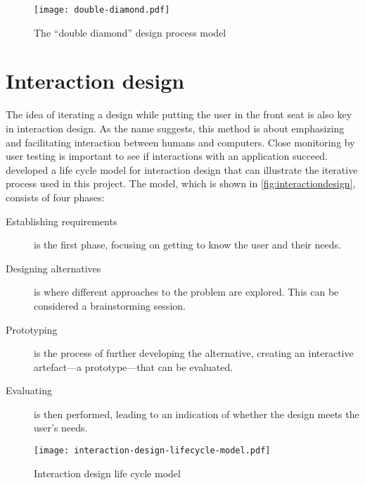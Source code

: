 \begin{figure}
    \centering
    \texttt{[image: double-diamond.pdf]}
    \caption{The \enquote{double diamond} design process model}
    \label{fig:doublediamond}
\end{figure}



\section{Interaction design}
\label{sec:interactiondesign}

The idea of iterating a design while putting the user in the front seat is also key in interaction design. As the name suggests, this method is about emphasizing and facilitating interaction between humans and computers. Close monitoring by user testing is important to see if interactions with an application succeed. \textcite{preece2015} developed a life cycle model for interaction design that can illustrate the iterative process used in this project. The model, which is shown in \autoref{fig:interactiondesign}, consists of four phases:

\begin{description}
    \item[Establishing requirements] is the first phase, focusing on getting to know the user and their needs.
    \item[Designing alternatives] is where different approaches to the problem are explored. This can be considered a brainstorming session.
    \item[Prototyping] is the process of further developing the alternative, creating an interactive artefact---a prototype---that can be evaluated.
    \item[Evaluating] is then performed, leading to an indication of whether the design meets the user's needs.
\end{description}

\begin{figure}
    \centering
    \texttt{[image: interaction-design-lifecycle-model.pdf]}
    \caption{Interaction design life cycle model}
    \label{fig:interactiondesign}
\end{figure}

